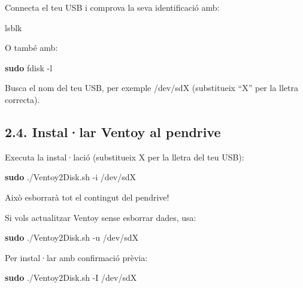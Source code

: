 \documentclass[
  12 pt,
  a4paper,
]{article}
\newenvironment{Shaded}{\begin{snugshade}}{\end{snugshade}}
\newcommand{\AttributeTok}[1]{\textcolor[rgb]{0.13,0.29,0.53}{#1}}
\newcommand{\ExtensionTok}[1]{#1}
\newcommand{\FunctionTok}[1]{\textcolor[rgb]{0.13,0.29,0.53}{\textbf{#1}}}
\newcommand{\NormalTok}[1]{#1}
\begin{document}
Connecta el teu USB i comprova la seva identificació amb:

\begin{Shaded}
\begin{Highlighting}[]
\ExtensionTok{lsblk}
\end{Highlighting}
\end{Shaded}

O també amb:

\begin{Shaded}
\begin{Highlighting}[]
\FunctionTok{sudo}\NormalTok{ fdisk }\AttributeTok{{-}l}
\end{Highlighting}
\end{Shaded}

Busca el nom del teu USB, per exemple /dev/sdX (substitueix ``X'' per la
lletra correcta).

\subsection{2.4. Instal·lar Ventoy al
pendrive}\label{installar-ventoy-al-pendrive}

Executa la instal·lació (substitueix X per la lletra del teu USB):

\begin{Shaded}
\begin{Highlighting}[]
\FunctionTok{sudo}\NormalTok{ ./Ventoy2Disk.sh }\AttributeTok{{-}i}\NormalTok{ /dev/sdX}
\end{Highlighting}
\end{Shaded}

Això esborrarà tot el contingut del pendrive!

Si vols actualitzar Ventoy sense esborrar dades, usa:

\begin{Shaded}
\begin{Highlighting}[]
\FunctionTok{sudo}\NormalTok{ ./Ventoy2Disk.sh }\AttributeTok{{-}u}\NormalTok{ /dev/sdX}
\end{Highlighting}
\end{Shaded}

Per instal·lar amb confirmació prèvia:

\begin{Shaded}
\begin{Highlighting}[]
\FunctionTok{sudo}\NormalTok{ ./Ventoy2Disk.sh }\AttributeTok{{-}I}\NormalTok{ /dev/sdX}
\end{Highlighting}
\end{Shaded}
\end{document}
